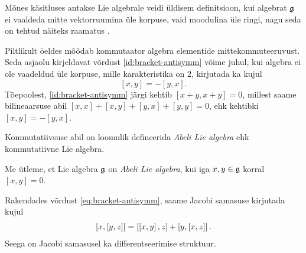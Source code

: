 \begin{markus}
    Mõnes käsitluses antakse Lie algebrale veidi üldisem definitsioon,
    kui algebrat $\mathfrak{g}$ ei vaaldeda mitte vektorruumina üle korpuse,
    vaid moodulina üle ringi, nagu seda on tehtud näiteks raamatus
    \cite{bourbaki1989lie}.
\end{markus}

Piltlikult öeldes mõõdab kommutaator algebra elementide mittekommuteeruvust.
Seda asjaolu kirjeldavat võrdust \eqref{id:bracket-antisymm} võime
juhul, kui algebra ei ole vaadeldud üle korpuse, mille karakteristika on $2$,
kirjutada ka kujul
\begin{equation}\label{eq:bracket-antisymm}
    [x, y] = -[y, x].
\end{equation}
Tõepoolest, \eqref{id:bracket-antisymm} järgi kehtib $[x+y, x+y] = 0$,
millest saame bilineaarsuse abil $[x, x] + [x, y] + [y, x] + [y, y] = 0$,
ehk kehtibki $[x, y] = -[y, x]$.

Kommutatiivsuse abil on loomulik defineerida \emph{Abeli Lie algebra} ehk
kommutatiivne Lie algebra.
\begin{dfn}
    Me ütleme, et Lie algebra $\mathfrak{g}$ on \emph{Abeli Lie algebra}, kui iga
    $x, y \in \mathfrak{g}$ korral $[x, y] = 0$.
\end{dfn}

Rakendades võrdust \eqref{eq:bracket-antisymm}, saame Jacobi samasuse
kirjutada kujul
\begin{align}\label{id:jacobi-modified}
    \left[ x, \left[ y, z \right] \right] = \left[ \left[ x, y \right], z \right] + \left[ y, \left[ x, z \right] \right].
\end{align}
Seega on Jacobi samasusel ka differentseerimise struktuur.

